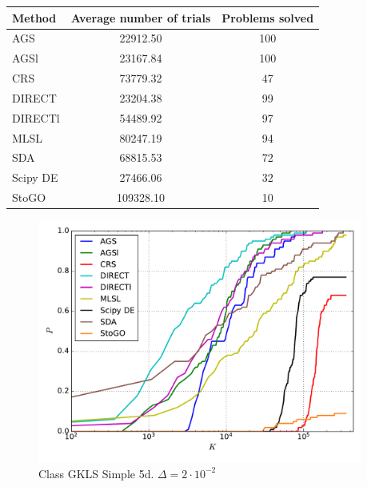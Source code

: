 \documentclass[a4paper]{article}
\begin{document}
\begin{tabular}{lcc}
\hline
 Method   &  Average number of trials  &  Problems solved  \\
\hline
 AGS      &          22912.50          &        100        \\
 AGSl     &          23167.84          &        100        \\
 CRS      &          73779.32          &        47         \\
 DIRECT   &          23204.38          &        99         \\
 DIRECTl  &          54489.92          &        97         \\
 MLSL     &          80247.19          &        94         \\
 SDA      &          68815.53          &        72         \\
 Scipy DE &          27466.06          &        32         \\
 StoGO    &         109328.10          &        10         \\
\hline
\end{tabular}
\begin{figure}[H]
  \center
  \includegraphics[width=0.95\textwidth]{../experiments/gklss5d/cmc.pdf}
  \caption{Class GKLS Simple 5d. $\Delta=2\cdot10^{-2}$}
\end{figure}
\end{document}
